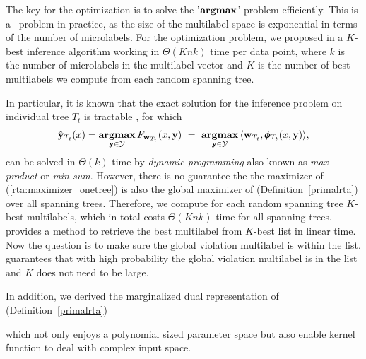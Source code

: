 {The key for the optimization is to solve the '$\textbf{argmax}$' problem efficiently.
This is a \nphard\ problem in practice, as the size of the multilabel space is exponential in terms of the number of microlabels.
For the optimization problem, we proposed in  a $K$-best inference algorithm working in $\Theta(Knk)$ time per data point, where $k$ is the number of microlabels in the multilabel vector and $K$ is the number of best multilabels we compute from each random spanning tree.

In particular, it is known that the exact solution for the inference problem on individual tree $T_t$ is tractable \citep{Koller09probabilistic}, for which 
\begin{align}\label{rta:maximizer_onetree}
	\hat{\mathbf {y}}_{T_t}(x) = \underset{\mathbf {y}\in\mathcal{Y}}{\textbf{argmax}}\, F_{\mathbf {w}_{T_t}}(x,\mathbf {y})\ =\ \underset{\mathbf {y}\in\mathcal{Y}}{\textbf{argmax}}\, \langle \mathbf {w}_{T_t}, \pmb \phi_{T_t}(x,\mathbf {y})\rangle,
\end{align}
can be solved in $\Theta(k)$ time by \textit{dynamic programming} also known as \textit{max-product} or \textit{min-sum}.
However, there is no guarantee the the maximizer of (\ref{rta:maximizer_onetree}) is also the global maximizer of (Definition~\ref{primalrta}) over all spanning trees.
Therefore, we compute for each random spanning tree $K$-best multilabels, which in total costs $\Theta(Knk)$ time for all spanning trees.
 provides a method to retrieve the best multilabel from $K$-best list in linear time.
Now the question is to make sure the global violation multilabel is within the list.
 guarantees that with high probability the global violation multilabel is in the list and $K$ does not need to be large.

In addition, we derived the marginalized dual representation of (Definition~\ref{primalrta})
\iffalse
\begin{definition}{\bf $L_2$-norm RTA Marginalized Dual.}
	\begin{align*}
		\underset{\vmu\in\Mcal^m}{\maximize} &\quad \frac{1}{|E_\Tcal|}\sum_{e,k,\vu_e}\mu(k,e,\vu_e)   -\frac{1}{2}\sum_{\substack{e,k,\vu_e,\\k',\vu_e'}} \mu(k,e,\vu_e) K_\Tcal^e(x_k,\vu_e;x_k',\vu'_e) \mu(k',e,\vu'_e)\, ,
	\end{align*}
\end{definition}
\fi
which not only enjoys a polynomial sized parameter space but also enable kernel function to deal with complex input space.


}
